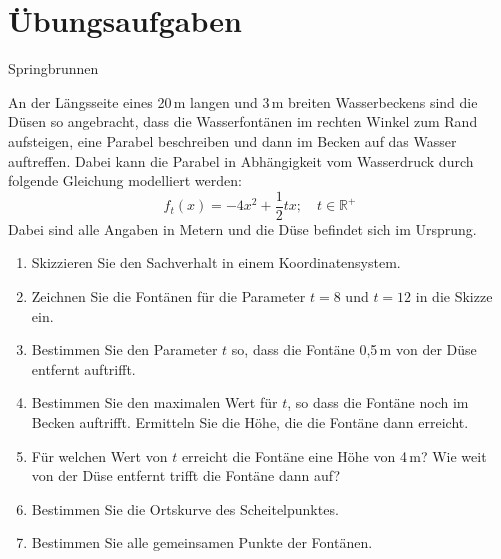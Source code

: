 \documentclass[11pt,a4paper,twoside,fleqn]{article}
\begin{document}
\section{Übungsaufgaben}
\begin{question}
  Springbrunnen

An der Längsseite eines 20\,m langen und 3\,m breiten Wasserbeckens
sind die Düsen so angebracht, dass die Wasserfontänen im rechten Winkel
zum Rand aufsteigen, eine Parabel beschreiben und dann im Becken auf
das Wasser auftreffen. Dabei kann die Parabel in Abhängigkeit vom
Wasserdruck durch folgende Gleichung modelliert werden:
$$f_t(x)=-4x^2+\frac 1 2 tx;\quad t\in\mathbb{R}^+$$
Dabei sind alle Angaben in Metern und die Düse befindet sich im
Ursprung.
\begin{enumerate}
\item Skizzieren Sie den Sachverhalt in einem Koordinatensystem.
\item Zeichnen Sie die Fontänen für die Parameter $t=8$ und $t=12$ in
  die Skizze ein.
\item Bestimmen Sie den Parameter $t$ so, dass die Fontäne 0,5\,m von der
  Düse entfernt auftrifft.
\item Bestimmen Sie den maximalen Wert für $t$, so dass die Fontäne
  noch im Becken auftrifft. Ermitteln Sie die Höhe, die die Fontäne
  dann erreicht.
\item Für welchen Wert von $t$ erreicht die Fontäne eine Höhe von
  4\,m? Wie weit von der Düse entfernt trifft die Fontäne dann auf?
\item Bestimmen Sie die Ortskurve des Scheitelpunktes.
\item Bestimmen Sie alle gemeinsamen Punkte der Fontänen.
\end{enumerate}

\end{question}
\end{document}
